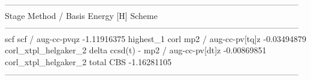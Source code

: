 \begin{Snippet}
  ---------------------------------------------------------------------------------------------------------
      Stage               Method / Basis                                Energy [H]   Scheme
  ---------------------------------------------------------------------------------------------------------
        scf                  scf / aug-cc-pvqz                         -1.11916375   highest_1
       corl                  mp2 / aug-cc-pv[tq]z                      -0.03494879   corl_xtpl_helgaker_2
      delta        ccsd(t) - mp2 / aug-cc-pv[dt]z                      -0.00869851   corl_xtpl_helgaker_2
      total                  CBS                                       -1.16281105
  ---------------------------------------------------------------------------------------------------------
\end{Snippet}


